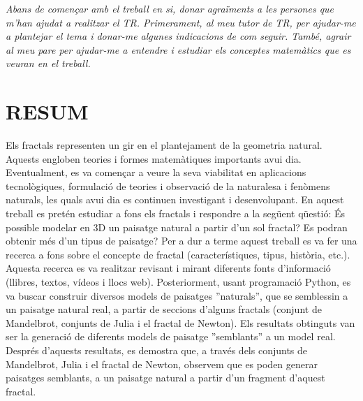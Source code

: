 \documentclass[12pt,a4paper]{report}
\begin{document}
\tableofcontents\hspace{0cm}
\newpage
\begin{flushright}
\textit{Abans de començar amb el treball en si, donar agraïments a les persones que m'han ajudat a realitzar el TR. Primerament, al meu tutor de TR, per ajudar-me a plantejar el tema i donar-me algunes indicacions de com seguir. També, agrair al meu pare per ajudar-me a entendre i estudiar els conceptes matemàtics que es veuran en el treball.}
\end{flushright}

\chapter*{RESUM}
Els fractals representen un gir en el plantejament de la geometria natural. Aquests engloben teories i formes matemàtiques importants avui dia. Eventualment, es va començar a veure la seva viabilitat en aplicacions tecnològiques, formulació de teories i observació de la naturalesa i fenòmens naturals, les quals avui dia es continuen investigant i desenvolupant. En aquest treball es pretén estudiar a fons els fractals i respondre a la següent qüestió: És possible modelar en 3D un paisatge natural a partir d'un sol fractal? Es podran obtenir més d’un tipus de paisatge? Per a dur a terme aquest treball es va fer una recerca a fons sobre el concepte de fractal (característiques, tipus, història, etc.). Aquesta recerca es va realitzar revisant i mirant diferents fonts d'informació (llibres, textos, vídeos i llocs web). Posteriorment, usant programació Python, es va buscar construir diversos models de paisatges ''naturals'', que se semblessin a un paisatge natural real, a partir de seccions d'alguns fractals (conjunt de Mandelbrot, conjunts de Julia i el fractal de Newton). Els resultats obtinguts van ser la generació de diferents models de paisatge ''semblants'' a un model real. Després d'aquests resultats, es demostra que, a través dels conjunts de Mandelbrot, Julia i el fractal de Newton, observem que es poden generar paisatges semblants, a un paisatge natural a partir d'un fragment d'aquest fractal.
\end{document}
